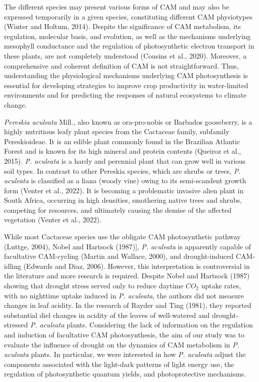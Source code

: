 \documentclass[
  12pt,
  letterpaper,
  DIV=11,
  numbers=noendperiod]{scrartcl}
\begin{document}
The different species may present various forms of CAM and may also be
expressed temporarily in a given species, constituting different CAM
physiotypes (Winter and Holtum, 2014). Despite the significance of CAM
metabolism, its regulation, molecular basis, and evolution, as well as
the mechanisms underlying mesophyll conductance and the regulation of
photosynthetic electron transport in these plants, are not completely
understood (Cousins et al., 2020). Moreover, a comprehensive and
coherent definition of CAM is not straightforward. Thus, understanding
the physiological mechanisms underlying CAM photosynthesis is essential
for developing strategies to improve crop productivity in water-limited
environments and for predicting the responses of natural ecosystems to
climate change.

\emph{Pereskia aculeata} Mill., also known as ora-pro-nobis or Barbados
gooseberry, is a highly nutritious leafy plant species from the
Cactaceae family, subfamily Pereskioideae. It is an edible plant
commonly found in the Brazilian Atlantic Forest and is known for its
high mineral and protein contents (Queiroz et al., 2015). \emph{P.
aculeata} is a hardy and perennial plant that can grow well in various
soil types. In contrast to other Pereskia species, which are shrubs or
trees, \emph{P. aculeata} is classified as a liana (woody vine) owing to
its semi-scandent growth form (Venter et al., 2022). It is becoming a
problematic invasive alien plant in South Africa, occurring in high
densities, smothering native trees and shrubs, competing for resources,
and ultimately causing the demise of the affected vegetation (Venter et
al., 2022).

While most Cactaceae species use the obligate CAM photosynthetic pathway
(Luttge, 2004), Nobel and Hartsock (1987){]}, \emph{P. aculeata} is
apparently capable of facultative CAM-cycling (Martin and Wallace,
2000), and drought-induced CAM-idling (Edwards and Diaz, 2006). However,
this interpretation is controversial in the literature and more research
is required. Despite Nobel and Hartsock (1987) showing that drought
stress served only to reduce daytime \(CO_2\) uptake rates, with no
nighttime uptake induced in \emph{P. aculeata}, the authors did not
measure changes in leaf acidity. In the research of Rayder and Ting
(1981), they reported substantial diel changes in acidity of the leaves
of well-watered and drought-stressed \emph{P. aculeata} plants.
Considering the lack of information on the regulation and induction of
facultative CAM photosynthesis, the aim of our study was to evaluate the
influence of drought on the dynamics of CAM metabolism in \emph{P.
aculeata} plants. In particular, we were interested in how \emph{P.
aculeata} adjust the components associated with the light-dark patterns
of light energy use, the regulation of photosynthetic quantum yields,
and photoprotective mechanisms.
\end{document}
